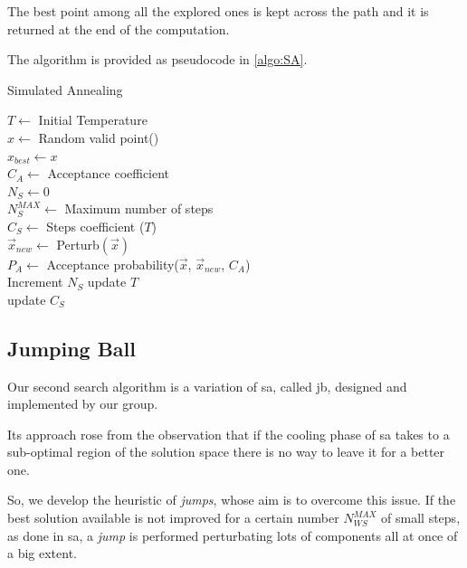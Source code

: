 \documentclass[12pt,journal,draftclsnofoot,onecolumn]{IEEEtran}
\begin{document}
The best point among all the explored ones is kept across the path and it is returned at the end of the computation.

The algorithm is provided as pseudocode in \autoref{algo:SA}.

\begin{algorithm}
\caption{Simulated Annealing} \label{algo:SA}
$T \gets$ Initial Temperature \\
$x \gets$ Random valid point() \\
$x_{best} \gets x$ \\
$C_A \gets$ Acceptance coefficient \\
$N_S \gets 0$ \\
$N_S^{MAX} \gets $ Maximum number of steps \\

 {
	$C_S \gets$ Steps coefficient ($T$) \\
	 {
		$\vec{x}_{new} \gets$ Perturb$(\vec{x})$\\
		$P_A \gets$ Acceptance probability($\vec{x}$, $\vec{x}_{new}$, $C_A$) \\
		Increment $N_S$
	}
	update $T$\\
	update $C_S$\\
}
\end{algorithm}

\subsection{Jumping Ball}

Our second search algorithm is a variation of \gls{sa}, called \gls{jb}, designed and implemented by our group.

Its approach rose from the observation that if the cooling phase of \gls{sa} takes to a sub-optimal region of the solution space there is no way to leave it for a better one.

So, we develop the heuristic of \emph{jumps}, whose aim is to overcome this issue. If the best solution available is not improved for a certain number $N_{WS}^{MAX}$ of small steps, as done in \gls{sa}, a \emph{jump} is performed perturbating lots of components all at once of a big extent.
\end{document}
